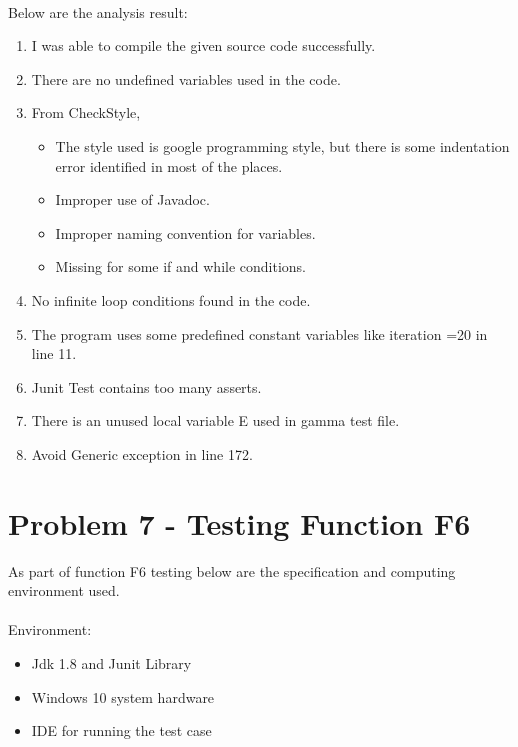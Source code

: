 \documentclass[12pt]{report}
\begin{document}
\paragraph{}Below are the analysis result:
\begin{enumerate}
    \item I was able to compile the given source code successfully.
    \item There are no undefined variables used in the code.
    \item From CheckStyle,
    \begin{itemize}
        \item The style used is google programming style, but there is some indentation error identified in most of the places.
        \item Improper use of Javadoc.
        \item Improper naming convention for variables.
        \item Missing {} for some if and while conditions.
    \end{itemize}
    \item No infinite loop conditions found in the code.
    \item The program uses some predefined constant variables like iteration =20 in line 11.
    \item Junit Test contains too many asserts.
    \item There is an unused local variable E used in gamma test file.
    \item Avoid Generic exception in line 172.
\end{enumerate}

\newpage
\section{Problem 7 - Testing Function F6}
As part of function F6 testing below are the specification and computing environment used.

\paragraph{}
Environment:

\begin{itemize}
    \item Jdk 1.8 and Junit Library
    \item Windows 10 system hardware
    \item IDE for running the test case

\end{itemize}
\end{document}

